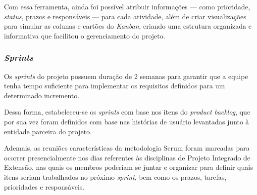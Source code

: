 Com essa ferramenta, ainda foi possível atribuir informações --- como prioridade, \textit{status}, prazos e responsáveis --- para cada atividade, além de criar visualizações para simular as colunas e cartões do \emph{Kanban}, criando uma estrutura organizada e informativa que facilitou o gerenciamento do projeto.

\subsubsection{\emph{Sprints}}

Os \textit{sprints} do projeto possuem duração de 2 semanas para garantir que a equipe tenha tempo suficiente para implementar os requisitos definidos para um determinado incremento.

Dessa forma, estabeleceu-se os \textit{sprints} com base nos itens do \textit{product backlog}, que por sua vez foram definidos com base nas histórias de usuário levantadas junto à entidade parceira do projeto.

Ademais, as reuniões características da metodologia Scrum foram marcadas para ocorrer presencialmente nos dias referentes às disciplinas de Projeto Integrado de Extensão, nas quais os membros poderiam se juntar e organizar para definir quais itens seriam trabalhados no próximo \textit{sprint}, bem como os prazos, tarefas, prioridades e responsáveis. 

